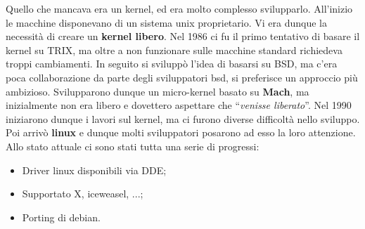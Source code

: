 Quello che mancava era un kernel, ed era molto complesso svilupparlo. All'inizio le macchine disponevano di un sistema unix proprietario. Vi era dunque la necessità di creare un \textbf{kernel libero}. Nel 1986 ci fu il primo tentativo di basare il kernel su TRIX, ma oltre a non funzionare sulle macchine standard richiedeva troppi cambiamenti. In seguito si sviluppò l'idea di basarsi su BSD, ma c'era poca collaborazione da parte degli sviluppatori bsd, si preferisce un approccio più ambizioso.
Svilupparono dunque un micro-kernel basato su \textbf{Mach}, ma inizialmente non era libero e dovettero aspettare che ``\textit{venisse liberato}''. Nel 1990 iniziarono dunque i lavori sul kernel, ma ci furono diverse difficoltà nello sviluppo. Poi arrivò \textbf{linux} e dunque molti sviluppatori posarono ad esso la loro attenzione. Allo stato attuale ci sono stati tutta una serie di progressi:

\begin{itemize}

	\item Driver linux disponibili via DDE;
	\item Supportato X, iceweasel, ...;
	\item Porting di debian.

\end{itemize} 